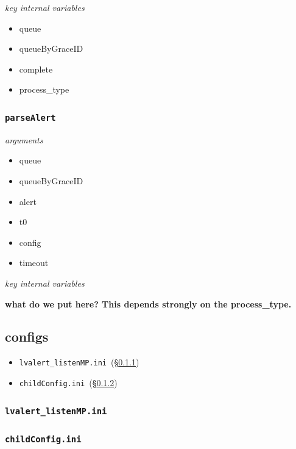 \documentclass{article}
\newcommand{\parseAlert}{\texttt{parseAlert}~}
\newcommand{\lvalertMPini}{\texttt{lvalert\_listenMP.ini}~}
\newcommand{\childConfigini}{\texttt{childConfig.ini}~}
\begin{document}
\noindent
\textit{key internal variables}

\begin{itemize}
    \item{queue}
    \item{queueByGraceID}
    \item{complete}
    \item{process\_type}
\end{itemize}


\subsubsection{\parseAlert}
\label{sec: parseAlert}

\noindent
\textit{arguments}

\begin{itemize}
    \item{queue}
    \item{queueByGraceID}
    \item{alert}
    \item{t0}
    \item{config}
    \item{timeout}
\end{itemize}

\noindent
\textit{key internal variables}

\textbf{what do we put here? This depends strongly on the process\_type.}


\subsection{configs}
\label{sec: configs}

\begin{itemize}
    \item{\lvalertMPini (\S\ref{sec: lvalertMPini})}
    \item{\childConfigini (\S\ref{sec: childConfigini})}
\end{itemize}


\subsubsection{\lvalertMPini}
\label{sec: lvalertMPini}


\subsubsection{\childConfigini}
\label{sec: childConfigini}
\end{document}
